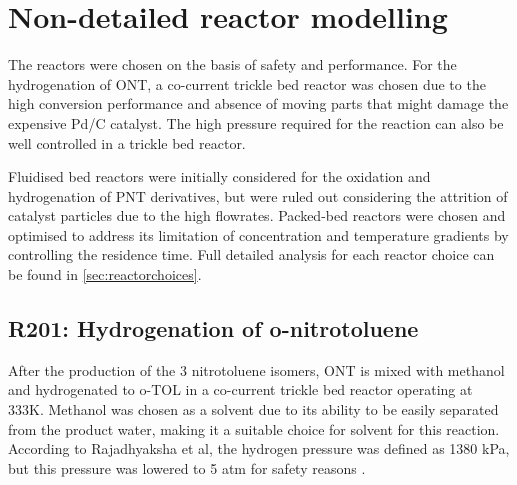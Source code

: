 \section{Non-detailed reactor modelling} \label{Non-detailed}

The reactors were chosen on the basis of safety and performance. For the hydrogenation of ONT, a co-current trickle bed reactor was chosen due to the high conversion performance and absence of moving parts that might damage the expensive Pd/C catalyst. The high pressure required for the reaction can also be well controlled in a trickle bed reactor. 

Fluidised bed reactors were initially considered for the oxidation and hydrogenation of PNT derivatives, but were ruled out considering the attrition of catalyst particles due to the high flowrates. Packed-bed reactors were chosen and optimised to address its limitation of concentration and temperature gradients by controlling the residence time. Full detailed analysis for each reactor choice can be found in \cref{sec:reactorchoices}.

\begin{table}[h]
\centering
\caption{Summary of non-detailed reactors}
\label{tab:nondetailedtable}
\end{table}

\subsection{R201: Hydrogenation of o-nitrotoluene}
After the production of the 3 nitrotoluene isomers, ONT is mixed with methanol and hydrogenated to o-TOL in a co-current trickle bed reactor operating at 333K. Methanol was chosen as a solvent due to its ability to be easily separated from the product water, making it a suitable choice for solvent for this reaction. According to Rajadhyaksha et al, the hydrogen pressure was defined as 1380 kPa, but this pressure was lowered to 5 atm for safety reasons \cite{rajadhyaksha_solvent_1986}. 

